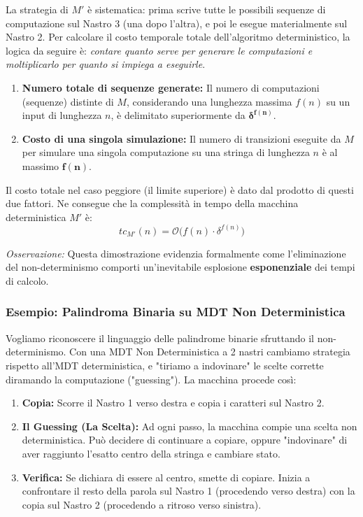La strategia di $M'$ è sistematica: prima scrive tutte le possibili sequenze di computazione sul Nastro 3 (una dopo l'altra), e poi le esegue materialmente sul Nastro 2. 
Per calcolare il costo temporale totale dell'algoritmo deterministico, la logica da seguire è: \textit{contare quanto serve per generare le computazioni e moltiplicarlo per quanto si impiega a eseguirle}.

\begin{enumerate}
    \item \textbf{Numero totale di sequenze generate:} Il numero di computazioni (sequenze) distinte di $M$, considerando una lunghezza massima $f(n)$ su un input di lunghezza $n$, è delimitato superiormente da $\mathbf{\delta^{f(n)}}$.
    \item \textbf{Costo di una singola simulazione:} Il numero di transizioni eseguite da $M$ per simulare una singola computazione su una stringa di lunghezza $n$ è al massimo $\mathbf{f(n)}$.
\end{enumerate}

Il costo totale nel caso peggiore (il limite superiore) è dato dal prodotto di questi due fattori. Ne consegue che la complessità in tempo della macchina deterministica $M'$ è:
$$ tc_{M'}(n) = \mathcal{O}\Big(f(n) \cdot \delta^{f(n)}\Big) $$

\textit{Osservazione:} Questa dimostrazione evidenzia formalmente come l'eliminazione del non-determinismo comporti un'inevitabile esplosione \textbf{esponenziale} dei tempi di calcolo.
\vspace{0.6cm}


\subsubsection*{Esempio: Palindroma Binaria su MDT Non Deterministica}
Vogliamo riconoscere il linguaggio delle palindrome binarie sfruttando il non-determinismo. 
Con una MDT Non Deterministica a 2 nastri cambiamo strategia rispetto all'MDT deterministica, e "tiriamo a indovinare" le scelte corrette diramando la computazione ("guessing"). La macchina procede così:
\begin{enumerate}
    \item \textbf{Copia:} Scorre il Nastro 1 verso destra e copia i caratteri sul Nastro 2.
    \item \textbf{Il Guessing (La Scelta):} Ad ogni passo, la macchina compie una scelta non deterministica. Può decidere di continuare a copiare, oppure "indovinare" di aver raggiunto l'esatto centro della stringa e cambiare stato.
    \item \textbf{Verifica:} Se dichiara di essere al centro, smette di copiare. Inizia a confrontare il resto della parola sul Nastro 1 (procedendo verso destra) con la copia sul Nastro 2 (procedendo a ritroso verso sinistra).
\end{enumerate}

